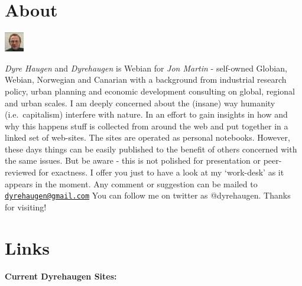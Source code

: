 \documentclass[
]{book}
\begin{document}
\hypertarget{appendix-appendices}{%
\appendix}


\hypertarget{about}{%
\chapter{About}\label{about}}

\includegraphics{fig/me.jpg}

\emph{Dyre Haugen} and \emph{Dyrehaugen} is Webian for \emph{Jon Martin} -
self-owned Globian, Webian, Norwegian and Canarian with
a background from industrial research policy, urban planning and
economic development consulting on global, regional and urban scales.
I am deeply concerned about the (insane) way
humanity (i.e.~capitalism) interfere with nature.
In an effort to gain insights in how and why this happens
stuff is collected from around the web and put together
in a linked set of web-sites.
The sites are operated as personal notebooks.
However, these days things can be easily published to the
benefit of others concerned with the same issues.
But be aware - this is not polished for presentation or
peer-reviewed for exactness.
I offer you just to have a look at my `work-desk' as it appears in the moment.
Any comment or suggestion can be mailed to \href{mailto:dyrehaugen@gmail.com}{\nolinkurl{dyrehaugen@gmail.com}}
You can follow me on twitter as @dyrehaugen.
Thanks for visiting!

\hypertarget{links}{%
\chapter{Links}\label{links}}

\textbf{Current Dyrehaugen Sites:}
\end{document}
